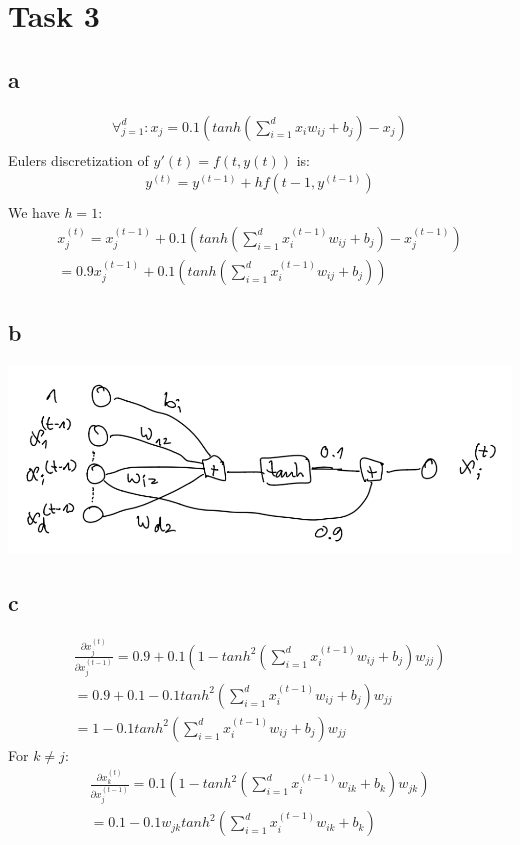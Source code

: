 \section*{Task 3}

\subsection*{a}

\begin{gather*}
\forall_{j=1}^d : x_j = 0.1(tanh(\sum_{i=1}^d x_i w_{ij} + b_j) - x_j) \\
\end{gather*}
Eulers discretization of $y'(t) = f(t,y(t))$ is: 
\begin{gather*}
y^{(t)} = y^{(t-1)} + hf(t-1, y^{(t-1)}) \\
\end{gather*}
We have $h=1$: 
\begin{gather*}
x_j^{(t)} = x_j^{(t-1)} + 0.1(tanh(\sum_{i=1}^d x_i^{(t-1)} w_{ij} + b_j) - x_j^{(t-1)}) \\
= 0.9 x_j^{(t-1)} + 0.1(tanh(\sum_{i=1}^d x_i^{(t-1)} w_{ij} + b_j))
\end{gather*}


\subsection*{b}

\includegraphics[scale=0.6]{task3b.png}

\subsection*{c}
\begin{gather*}
\frac{\partial x_j^{(t)}}{\partial x_j^{(t-1)}} = 0.9 + 0.1(1 - tanh^2(\sum_{i=1}^d x_i^{(t-1)} w_{ij} + b_j) w_{jj}) \\
= 0.9 + 0.1 - 0.1 tanh^2(\sum_{i=1}^d x_i^{(t-1)} w_{ij} + b_j) w_{jj} \\
= 1 - 0.1 tanh^2(\sum_{i=1}^d x_i^{(t-1)} w_{ij} + b_j) w_{jj}
\end{gather*}
For $k \neq j$: 
\begin{gather*}
\frac{\partial x_k^{(t)}}{\partial x_j^{(t-1)}} = 0.1(1 - tanh^2(\sum_{i=1}^d x_i^{(t-1)} w_{ik} + b_k) w_{jk}) \\
= 0.1 - 0.1 w_{jk} tanh^2(\sum_{i=1}^d x_i^{(t-1)} w_{ik} + b_k)
\end{gather*}

